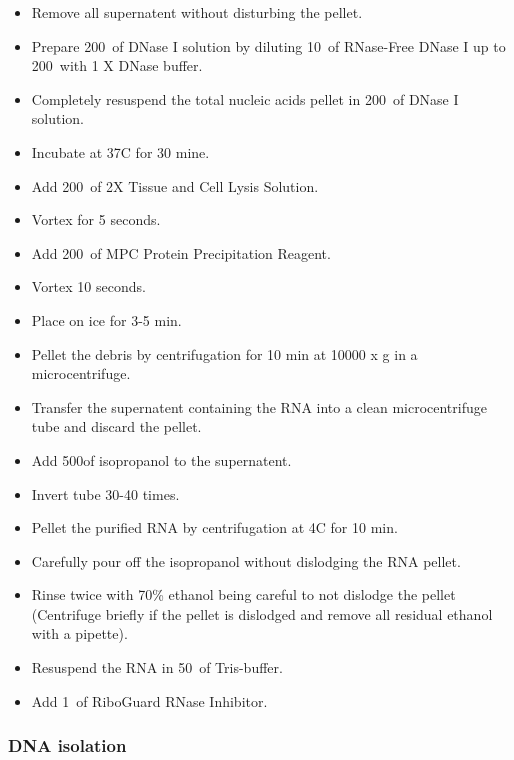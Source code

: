 \begin{itemize}
\item Remove all supernatent without disturbing the pellet.
\item Prepare 200~\uL of DNase I solution by diluting 10~\uL of RNase-Free DNase I up to 200~\uL with 1 X DNase buffer.
\item Completely resuspend the total nucleic acids pellet in 200~\uL of DNase I solution.
\item Incubate at 37\degree C for 30 mine.
\item Add 200~\uL of 2X Tissue and Cell Lysis Solution.
\item Vortex for 5 seconds.
\item Add 200~\uL of MPC Protein Precipitation Reagent.
\item Vortex 10 seconds.
\item Place on ice for 3-5 min.
\item Pellet the debris by centrifugation for 10 min at 10000 x g in a microcentrifuge.
\item Transfer the supernatent containing the RNA into a clean microcentrifuge tube and discard the pellet.
\item Add 500\uL of isopropanol to the supernatent.
\item Invert tube 30-40 times.
\item Pellet the purified RNA by centrifugation at 4\degree C for 10 min.
\item Carefully pour off the isopropanol without dislodging the RNA pellet.
\item Rinse twice with 70\% ethanol being careful to not dislodge the pellet (Centrifuge briefly if the pellet is dislodged and remove all residual ethanol with a pipette).
\item Resuspend the RNA in 50~\uL of Tris-buffer.
\item Add 1~\uL of RiboGuard RNase Inhibitor.
\end{itemize}

\subsubsection{DNA isolation}

